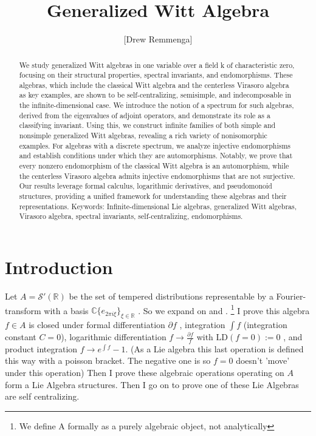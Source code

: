 \documentclass[10pt, oneside]{article}
\title{Generalized Witt Algebra}
\author{[Drew Remmenga]}
\newcommand{\C}{\mathbb{C}}
\newcommand{\R}{\mathbb{R}}
\begin{document}
\nocite{*}

\maketitle
\begin{abstract}
We study generalized Witt algebras in one variable over a field k of characteristic zero, focusing on their structural properties, spectral invariants, and endomorphisms. These algebras, which include the classical Witt algebra and the centerless Virasoro algebra as key examples, are shown to be self-centralizing, semisimple, and indecomposable in the infinite-dimensional case. We introduce the notion of a spectrum for such algebras, derived from the eigenvalues of adjoint operators, and demonstrate its role as a classifying invariant. 
Using this, we construct infinite families of both simple and nonsimple generalized Witt algebras, revealing a rich variety of nonisomorphic examples.
For algebras with a discrete spectrum, we analyze injective endomorphisms and establish conditions under which they are automorphisms. Notably, we prove that every nonzero endomorphism of the classical Witt algebra is an automorphism, while the centerless Virasoro algebra admits injective endomorphisms that are not surjective. Our results leverage formal calculus, logarithmic derivatives, and pseudomonoid structures, providing a unified framework for understanding these algebras and their representations.
Keywords: Infinite-dimensional Lie algebras, generalized Witt algebras, Virasoro algebra, spectral invariants, self-centralizing, endomorphisms.
\end{abstract}
\section{Introduction}
   Let $A=\mathcal{S}'(\R)$ be the set of tempered distributions representable by a Fourier-transform with a basis $\C\{e_{2 \pi i \xi}\}_{\xi \in \R}$ \cite{Hormander1958}. So we expand on \cite{pakianathan2010generalizedwittalgebrasvariable} and \cite{Kac1974}. \footnote{We define A formally as a purely algebraic object, not analytically} 
   I prove this algebra $f \in A$ is closed under formal differentiation $\partial f$ \cite{Dokovic1998}, integration $\int f$ (integration constant $C=0$),
   logarithmic differentiation $f \to \frac{\partial f}{f}$ with $\text{LD}(f=0):=0$ \cite{pakianathan2010generalizedwittalgebrasvariable}, and product integration $f \to e^{\int f} - 1$. (As a Lie algebra this last operation is defined this way with a poisson bracket. The negative one is so $f=0$ doesn't 'move' under this operation) 
   Then I prove these algebraic operations operating on $A$ form a Lie Algebra structures. 
   Then I go on to prove one of these Lie Algebras are self centralizing.
\end{document}
